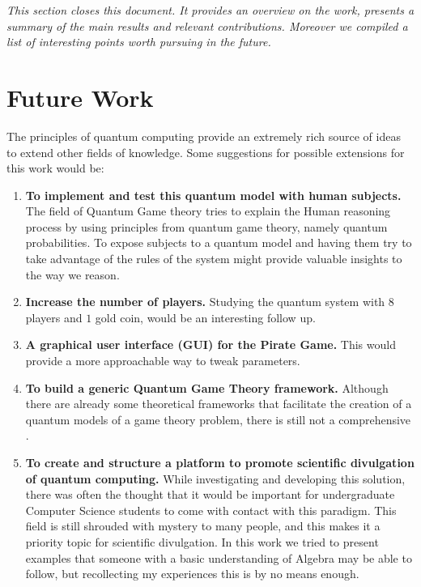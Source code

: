 \label{cap:conclusions}

\textit{This section closes this document. It provides an overview on the work, presents a summary of the main results and relevant contributions. Moreover we compiled a list of interesting points worth pursuing in the future.}


\section{Future Work}
\label{sec:5FutureWork}

The principles of quantum computing provide an extremely rich source of ideas to extend other fields of knowledge.
Some suggestions for possible extensions for this work would be:

\begin{enumerate}
\item \textbf{To implement and test this quantum model with human subjects.} The field of Quantum Game theory tries to explain the Human reasoning process by using principles from quantum game theory, namely quantum probabilities. To expose subjects to a quantum model and having them try to take advantage of the rules of the system might provide valuable insights to the way we reason. 
\item \textbf{Increase the number of players.} Studying the quantum system with $8$ players and $1$ gold coin, would be an interesting follow up.
\item \textbf{A graphical user interface (GUI) for the Pirate Game.} This would provide a more approachable way to tweak parameters.
\item \textbf{To build a generic Quantum Game Theory framework.} Although there are already some theoretical frameworks that facilitate the creation of a quantum models of a game theory problem, there is still not a comprehensive .
\item \textbf{To create and structure a platform to promote scientific divulgation of quantum computing.} While investigating and developing this solution, there was often the thought that it would be important for undergraduate Computer Science students to come with contact with this paradigm. This field is still shrouded with mystery to many people, and this makes it a priority topic for scientific divulgation. In this work we tried to present examples that someone with a basic understanding of Algebra may be able to follow, but recollecting my experiences this is by no means enough.
\end{enumerate}

\cleardoublepage
